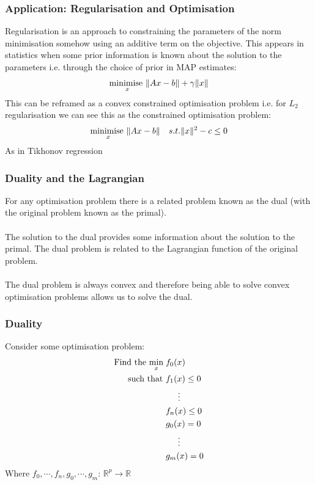 \documentclass{beamer}
\DeclarePairedDelimiter\norm{\lVert}{\rVert}
\def\rnum{\mathbb{R}}
\begin{document}
\begin{frame}
    \frametitle{Application: Regularisation and Optimisation}
    Regularisation is an approach to constraining the parameters of the norm
    minimisation somehow using an additive term on the objective. This appears
    in statistics when some prior information is known about the solution to the
    parameters i.e. through the choice of prior in MAP estimates:
    \begin{align*}
        \underset{x}{\text{minimise }} \norm{Ax - b}+ \gamma\norm{x}
    \end{align*}
    This can be reframed as a convex constrained optimisation problem i.e. for
    $L_{2}$ regularisation we can see this as the constrained optimisation
    problem:
    \begin{align*}
        &\underset{x}{\text{minimise }} \norm{Ax - b}
        &s.t. \norm{x}^{2} - c \leq 0
    \end{align*}
    As in Tikhonov regression
\end{frame}

\begin{frame}
    \frametitle{Duality and the Lagrangian}
    For any optimisation problem there is a related problem known as the dual
    (with the original problem known as the primal).
    \\~\\
    The solution to the dual provides some information about the solution to the
    primal. The dual problem is related to the Lagrangian function of the
    original problem.
    \\~\\
    The dual problem is always convex and therefore being able to solve
    convex optimisation problems allows us to solve the dual.
\end{frame}

\begin{frame}
    \frametitle{Duality}
    Consider some optimisation problem:
    {\footnotesize
    \begin{align*}
        \text{Find the }\underset{x}{\text{min}}\; &f_{0}(x) \\
        \text{  such that }&f_{1}(x) \leq 0 \\
        & \hspace{5mm} \vdots \\
        &f_{n}(x) \leq 0 \\
        &g_{0}(x) = 0 \\
        &\hspace{5mm} \vdots \\
        &g_{m}(x) = 0
    \end{align*}}
    Where $f_0,\cdots, f_n, g_0, \cdots, g_m:\, \rnum^{p} \rightarrow \rnum$
\end{frame}
\end{document}
